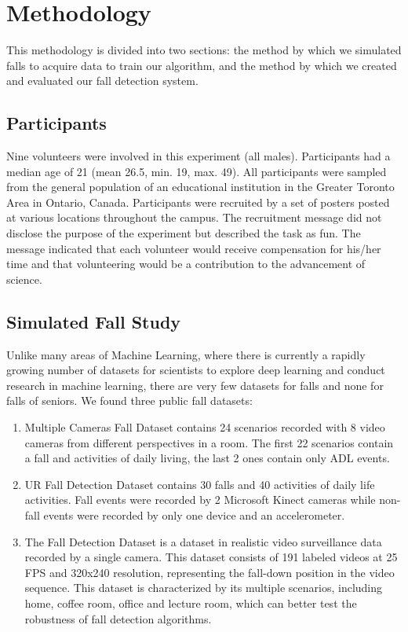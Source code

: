 \chapter{Methodology}
This methodology is divided into two sections: the method by which we simulated falls to acquire data to train our algorithm, and the method by which we created and evaluated our fall detection system.

\section{Participants}
Nine volunteers were involved in this experiment (all males). Participants had a median age of 21 (mean 26.5, min. 19, max. 49). All participants were sampled from the general population of an educational institution in the Greater Toronto Area in Ontario, Canada. Participants were recruited by a set of posters posted at various locations throughout the campus. The recruitment message did not disclose the purpose of the experiment but described the task as fun. The message indicated that each volunteer would receive compensation for his/her time and that volunteering would be a contribution to the advancement of science.


\section{Simulated Fall Study}
Unlike many areas of Machine Learning, where there is currently a rapidly growing number of datasets for scientists to explore deep learning and conduct research in machine learning, there are very few datasets for falls and none for falls of seniors. We found three public fall datasets:

\begin{enumerate}
    \item Multiple Cameras Fall Dataset \cite{Auvinet2011} contains 24 scenarios recorded with 8 video cameras from different perspectives in a room. The first 22 scenarios contain a fall and activities of daily living, the last 2 ones contain only ADL events.
    \item UR Fall Detection Dataset \cite{Kwolek2014} contains 30 falls and 40 activities of daily life activities. Fall events were recorded by 2 Microsoft Kinect cameras while non-fall events were recorded by only one device and an accelerometer.
    \item The Fall Detection Dataset \cite{Antoine2013} is a dataset in realistic video surveillance data recorded by a single camera. This dataset consists of 191 labeled videos at 25 FPS and 320x240 resolution, representing the fall-down position in the video sequence. This dataset is characterized by its multiple scenarios, including home, coffee room, office and lecture room, which can better test the robustness of fall detection algorithms.
\end{enumerate}


